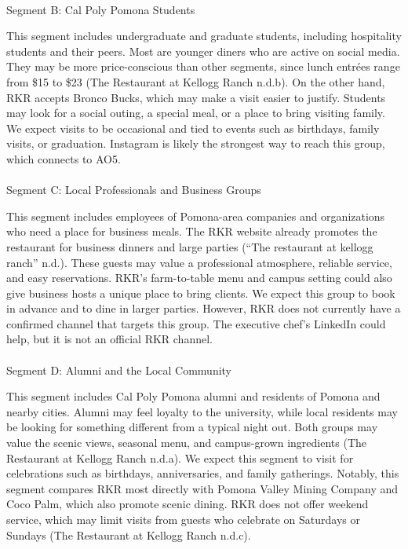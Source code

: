 \documentclass[
  12pt,
  letterpaper,
  DIV=11,
  numbers=noendperiod]{scrartcl}
\makeatletter
\let\oldparagraph\paragraph
\renewcommand{\paragraph}{
    \@ifstar
      \xxxParagraphStar
      \xxxParagraphNoStar
  }
\newcommand{\xxxParagraphStar}[1]{\oldparagraph*{#1}\mbox{}}
\newcommand{\xxxParagraphNoStar}[1]{\oldparagraph{#1}\mbox{}}
\makeatother
\begin{document}
\paragraph{Segment B: Cal Poly Pomona
Students}\label{segment-b-cal-poly-pomona-students}

This segment includes undergraduate and graduate students, including
hospitality students and their peers. Most are younger diners who are
active on social media. They may be more price-conscious than other
segments, since lunch entrées range from \$15 to \$23 (The Restaurant at
Kellogg Ranch n.d.b). On the other hand, RKR accepts Bronco Bucks, which
may make a visit easier to justify. Students may look for a social
outing, a special meal, or a place to bring visiting family. We expect
visits to be occasional and tied to events such as birthdays, family
visits, or graduation. Instagram is likely the strongest way to reach
this group, which connects to AO5.

\paragraph{Segment C: Local Professionals and Business
Groups}\label{segment-c-local-professionals-and-business-groups}

This segment includes employees of Pomona-area companies and
organizations who need a place for business meals. The RKR website
already promotes the restaurant for business dinners and large parties
({``The restaurant at kellogg ranch''} n.d.). These guests may value a
professional atmosphere, reliable service, and easy reservations. RKR's
farm-to-table menu and campus setting could also give business hosts a
unique place to bring clients. We expect this group to book in advance
and to dine in larger parties. However, RKR does not currently have a
confirmed channel that targets this group. The executive chef's LinkedIn
could help, but it is not an official RKR channel.

\paragraph{Segment D: Alumni and the Local
Community}\label{segment-d-alumni-and-the-local-community}

This segment includes Cal Poly Pomona alumni and residents of Pomona and
nearby cities. Alumni may feel loyalty to the university, while local
residents may be looking for something different from a typical night
out. Both groups may value the scenic views, seasonal menu, and
campus-grown ingredients (The Restaurant at Kellogg Ranch n.d.a). We
expect this segment to visit for celebrations such as birthdays,
anniversaries, and family gatherings. Notably, this segment compares RKR
most directly with Pomona Valley Mining Company and Coco Palm, which
also promote scenic dining. RKR does not offer weekend service, which
may limit visits from guests who celebrate on Saturdays or Sundays (The
Restaurant at Kellogg Ranch n.d.c).
\end{document}
